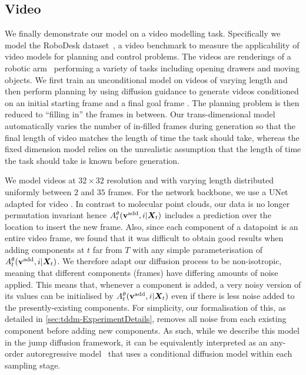 \subsection{Video}

We finally demonstrate our model on a video modelling task. Specifically we model the RoboDesk dataset~\citep{tian2023control}, a video benchmark to measure the applicability of video models for planning and control problems. The videos are renderings of a robotic arm~\citep{kannan2021robodesk} performing a variety of tasks including opening drawers and moving objects.
We first train an unconditional model on videos of varying length and then perform planning by using diffusion guidance to generate videos conditioned on an initial starting frame and a final goal frame \cite{janner2022diffuser}. The planning problem is then reduced to ``filling in'' the frames in between. Our trans-dimensional model automatically varies the number of in-filled frames during generation so that the final length of video matches the length of time the task should take, whereas the fixed dimension model relies on the unrealistic assumption that the length of time the task should take is known before generation.

We model videos at $32 \times 32$ resolution and with varying length distributed uniformly between $2$ and $35$ frames. For the network backbone, we use a UNet adapted for video \cite{harvey2022flexible}. In contrast to molecular point clouds, our data is no longer permutation invariant hence $A_t^\theta({\mathbf{v}}^{\textup{add}}, i | {\bm{X}}_t)$ includes a prediction over the location to insert the new frame. Also, since each component of a datapoint is an entire video frame, we found that it was difficult to obtain good results when adding components at $t$ far from $T$ with any simple parameterisation of $A_t^\theta({\mathbf{v}}^{\textup{add}}, i | {\bm{X}}_t)$. We therefore adapt our diffusion process to be non-isotropic, meaning that different components (frames) have differing amounts of noise applied. This means that, whenever a component is added, a very noisy version of its values can be initialised by $A_t^\theta({\mathbf{v}}^{\textup{add}}, i | {\bm{X}}_t)$ even if there is less noise added to the presently-existing components. For simplicity, our formalisation of this, as detailed in \cref{sec:tddm-ExperimentDetails}, removes all noise from each existing component before adding new components. As such, while we describe this model in the jump diffusion framework, it can be equivalently interpreted as an any-order autoregressive model~\citep{shih2022training} that uses a conditional diffusion model within each sampling stage. 

